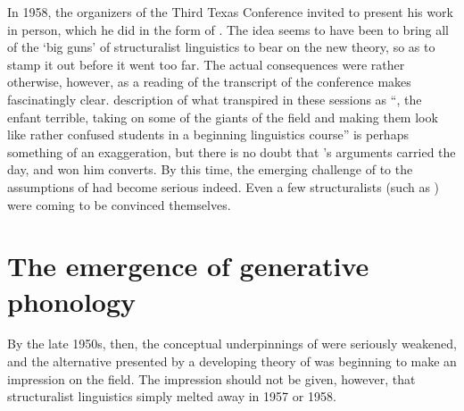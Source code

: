In 1958, the organizers of the Third Texas Conference invited {\Chomsky}
to present his work in person, which he did in the form of
\citealt{chomsky62:3texas}. The idea seems to have been to bring all
of the `big guns' of structuralist linguistics to bear on the new
theory, so as to stamp it out before it went too far. The actual
consequences were rather otherwise, however, as a reading of the
transcript of the conference \citep{hill62:3texas} makes fascinatingly
clear.  description of what transpired
in these sessions as ``{\Chomsky}, the enfant terrible, taking on some of
the giants of the field and making them look like rather confused
students in a beginning linguistics course'' is perhaps something of
an exaggeration, but there is no doubt that {\Chomsky}'s arguments
carried the day, and won him converts. By this time, the emerging
challenge of  to the assumptions of  had become serious indeed. Even a few structuralists
(such as ) were coming to be convinced themselves.

\section{The emergence of generative phonology}
\label{sec:emergence}

By the late 1950s, then, the conceptual underpinnings of  were seriously weakened, and the alternative presented
by a developing theory of  was beginning to make an
impression on the field. The impression should not be given, however,
that structuralist linguistics simply melted away in 1957 or 1958.

